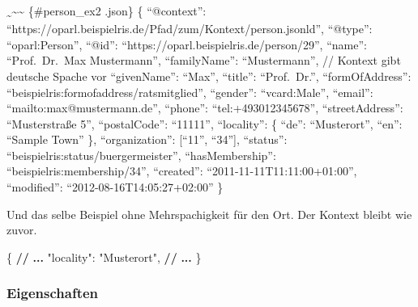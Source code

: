 \documentclass[,a4paper]{article}
\newenvironment{Shaded}{}{}
\newcommand{\DataTypeTok}[1]{\textcolor[rgb]{0.56,0.13,0.00}{{#1}}}
\newcommand{\StringTok}[1]{\textcolor[rgb]{0.25,0.44,0.63}{{#1}}}
\newcommand{\FunctionTok}[1]{\textcolor[rgb]{0.02,0.16,0.49}{{#1}}}
\newcommand{\ErrorTok}[1]{\textcolor[rgb]{1.00,0.00,0.00}{\textbf{{#1}}}}
\begin{document}
\textsubscript{\textasciitilde{}}\textasciitilde{}\textasciitilde{}
\{\#person\_ex2 .json\} \{ ``@context'':
``https://oparl.beispielris.de/Pfad/zum/Kontext/person.jsonld'',
``@type'': ``oparl:Person'', ``@id'':
``https://oparl.beispielris.de/person/29'', ``name'': ``Prof.~Dr.~Max
Mustermann'', ``familyName'': ``Mustermann'', // Kontext gibt deutsche
Spache vor ``givenName'': ``Max'', ``title'': ``Prof.~Dr.'',
``formOfAddress'': ``beispielris:formofaddress/ratsmitglied'',
``gender'': ``vcard:Male'', ``email'': ``mailto:max@mustermann.de'',
``phone'': ``tel:+493012345678'', ``streetAddress'': ``Musterstraße 5'',
``postalCode'': ``11111'', ``locality'': \{ ``de'': ``Musterort'',
``en'': ``Sample Town'' \}, ``organization'': {[}``11'', ``34''{]},
``status'': ``beispielris:status/buergermeister'', ``hasMembership'':
``beispielris:membership/34'', ``created'':
``2011-11-11T11:11:00+01:00'', ``modified'':
``2012-08-16T14:05:27+02:00'' \}

Und das selbe Beispiel ohne Mehrspachigkeit für den Ort. Der Kontext
bleibt wie zuvor.

\begin{Shaded}
\begin{Highlighting}[]
\FunctionTok{\{}
    \ErrorTok{//} \ErrorTok{...}
    \DataTypeTok{"locality"}\FunctionTok{:} \StringTok{"Musterort"}\FunctionTok{,}
    \ErrorTok{//} \ErrorTok{...}
\FunctionTok{\}}
\end{Highlighting}
\end{Shaded}

\subsubsection{Eigenschaften}\label{eigenschaften-3}
\end{document}
